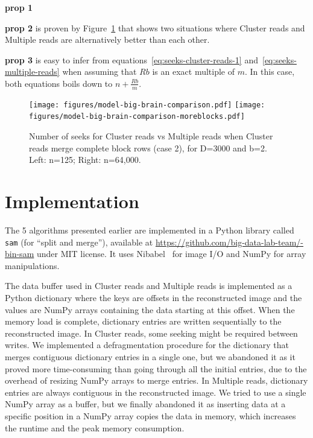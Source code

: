 \documentclass[10pt, conference, compsocconf]{IEEEtran}
\newcommand{\todo}[1]{\marginpar{\parbox{18mm}{\flushleft\tiny\color{red}\textbf{TODO}:
      #1}}}
\begin{document}
\textbf{prop 1} \todo{do it!}

 \textbf{prop 2} is proven by Figure~\ref{fig:model-comparison} that
 shows two situations where Cluster reads and Multiple reads are
 alternatively better than each other.

 \textbf{prop 3} is easy to infer from
 equations~\ref{eq:seeks-cluster-reads-1}
 and~\ref{eq:seeks-multiple-reads} when assuming that $Rb$ is an exact
 multiple of $m$. In this case, both equations boils down to
 $n+\frac{Rb}{m}$.

\begin{figure}
  \texttt{[image: figures/model-big-brain-comparison.pdf]}
  \texttt{[image: figures/model-big-brain-comparison-moreblocks.pdf]}
  \caption{Number of seeks for Cluster reads vs Multiple reads when
    Cluster reads merge complete block rows (case 2), for D=3000 and
    b=2. Left: n=125; Right: n=64,000.}
  \label{fig:model-comparison}
\end{figure}

\section{Implementation}
\label{sec:implementation}

The 5 algorithms presented earlier are implemented in a Python library
called \texttt{sam} (for ``split and merge''), available at
\url{https://github.com/big-data-lab-team/-bin-sam} under MIT
license. It uses Nibabel~\cite{matthew_brett_2016_60808} for image I/O
and NumPy for array manipulations.

The data buffer used in Cluster reads and Multiple reads is
implemented as a Python dictionary where the keys are offsets in the
reconstructed image and the values are NumPy arrays containing the
data starting at this offset. When the memory load is complete,
dictionary entries are written sequentially to the reconstructed
image. In Cluster reads, some seeking might be required between
writes. We implemented a defragmentation procedure for the dictionary
that merges contiguous dictionary entries in a single one, but we
abandoned it as it proved more time-consuming than going through all
the initial entries, due to the overhead of resizing NumPy arrays to
merge entries. In Multiple reads, dictionary entries are always
contiguous in the reconstructed image.  We tried to use a single NumPy
array as a buffer, but we finally abandoned it as inserting data at a
specific position in a NumPy array copies the data in memory, which
increases the runtime and the peak memory consumption.
\end{document}
